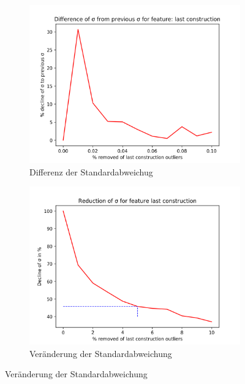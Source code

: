 \begin{figure}[H]
\begin{subfigure}{.5\textwidth}
  \includegraphics[width=\linewidth]{images/anhang/outlier_detection/last_construction_diff_of_std.png}
  \caption{Differenz der Standardabweichug} 
\end{subfigure}
\begin{subfigure}{.5\textwidth}
  \centering
  \includegraphics[width=\linewidth]{images/anhang/outlier_detection/last_construction_std.png}
  \caption{Veränderung der Standardabweichung} 
\end{subfigure}
\end{figure}

